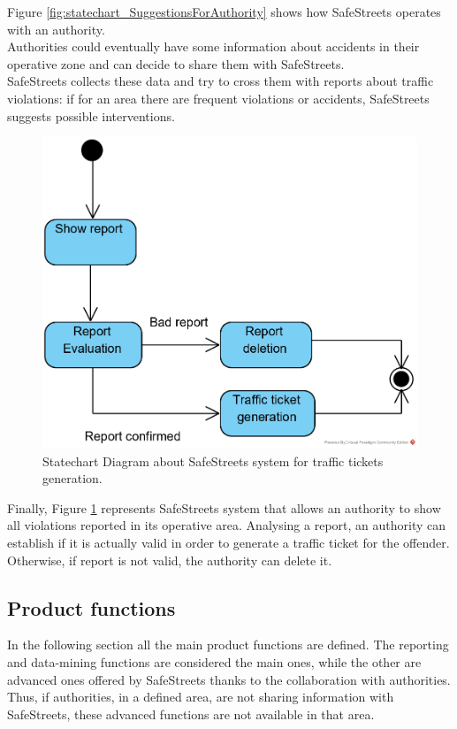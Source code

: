 \documentclass{article}
\begin{document}
			Figure \ref{fig:statechart_SuggestionsForAuthority} shows how SafeStreets operates with an authority.\\
			Authorities could eventually have some information about accidents in their operative zone and can decide to share them with SafeStreets.\\
			SafeStreets collects these data and try to cross them with reports about traffic violations: if for an area there are frequent violations or accidents, SafeStreets suggests possible interventions.
			
			\clearpage
			
			\begin{figure}[H]
				\centering
				\includegraphics {diagrams/statechart_trafficTicket.png}
				\caption[Statechart Diagram3]{Statechart Diagram about SafeStreets system for traffic tickets generation.}
				\label{fig:statechart_trafficTickets}
			\end{figure}
			
			Finally, Figure \ref{fig:statechart_trafficTickets} represents SafeStreets system that allows an authority to show all violations reported in its operative area. Analysing a report, an authority can establish if it is actually valid in order to generate a traffic ticket for the offender. Otherwise, if report is not valid, the authority can delete it.
			
			\clearpage	   
	
		\subsection{Product functions}
			In the following section all the main product functions are defined. The reporting and data-mining functions are considered the main ones, while the other are advanced ones offered by SafeStreets thanks to the collaboration with authorities. Thus, if authorities, in a defined area, are not sharing information with SafeStreets, these advanced functions are not available in that area.
			
\end{document}
